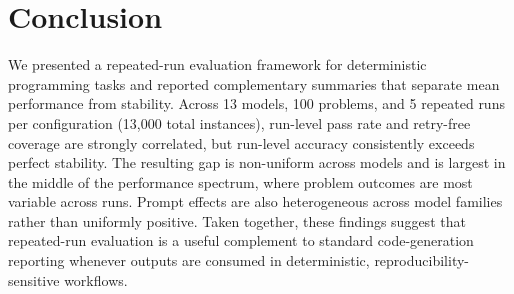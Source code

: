\documentclass[11pt]{article}
\begin{document}
\section{Conclusion}

We presented a repeated-run evaluation framework for deterministic programming tasks and reported complementary summaries that separate mean performance from stability. Across 13 models, 100 problems, and 5 repeated runs per configuration (13{,}000 total instances), run-level pass rate and retry-free coverage are strongly correlated, but run-level accuracy consistently exceeds perfect stability. The resulting gap is non-uniform across models and is largest in the middle of the performance spectrum, where problem outcomes are most variable across runs. Prompt effects are also heterogeneous across model families rather than uniformly positive. Taken together, these findings suggest that repeated-run evaluation is a useful complement to standard code-generation reporting whenever outputs are consumed in deterministic, reproducibility-sensitive workflows.


\end{document}
